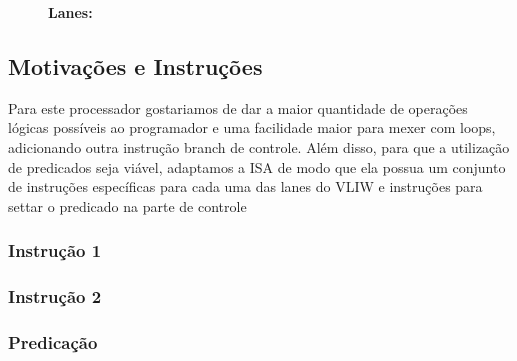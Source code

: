 \documentclass{article}
\begin{document}
    \begin{figure}[H]
        \captionsetup{labelformat=empty, skip=0pt}
        \caption{\textbf{Lanes:}}
        \centering 
    \end{figure}

    \subsection{Motivações e Instruções}

    Para este processador gostariamos de dar a maior quantidade de operações lógicas possíveis ao programador e uma facilidade maior para mexer com loops, adicionando outra instrução branch de controle. Além disso, para que a utilização de predicados seja viável, adaptamos a ISA de modo que ela possua um conjunto de instruções específicas para cada uma das lanes do VLIW e instruções para settar o predicado na parte de controle


    \subsubsection{Instrução 1}

    \subsubsection{Instrução 2}

    \subsubsection{Predicação}
\end{document}
